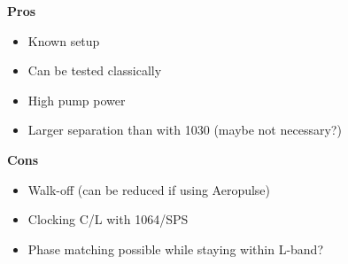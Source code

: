 \documentclass[11pt, headings=optiontoheadandtoc]{article}
\begin{document}
\begin{figure}[h]
\begin{minipage}[t]{0.5\textwidth}
    \textbf{Pros}
    \begin{itemize}
        \item Known setup
        \item Can be tested classically
        \item High pump power
        \item Larger separation than with 1030 (maybe not necessary?)
    \end{itemize}
\end{minipage}%
\hfill
\begin{minipage}[t]{0.5\textwidth}
    \textbf{Cons}
    \begin{itemize}
        \item Walk-off (can be reduced if using Aeropulse)
        \item Clocking C/L with 1064/SPS
        \item Phase matching possible while staying within L-band?
    \end{itemize}
\end{minipage}
\end{figure}
\newpage
\end{document}
